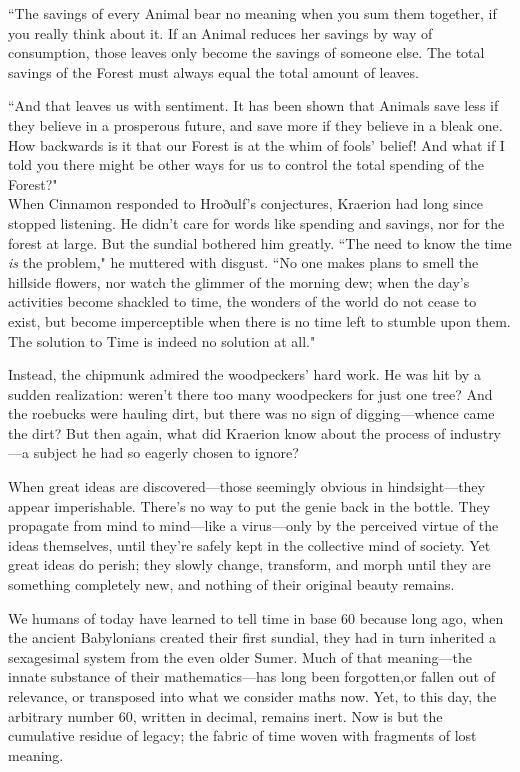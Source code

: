 ``The savings of every Animal bear no meaning when you sum them together, if you really think about it.
If an Animal reduces her savings by way of consumption, those leaves only become the savings of someone else.
The total savings of the Forest must always equal the total amount of leaves.

``And that leaves us with sentiment.
It has been shown that Animals save less if they believe in a prosperous future, and save more if they believe in a bleak one.
How backwards is it that our Forest is at the whim of fools' belief!
And what if I told you there might be other ways for us to control the total spending of the Forest?"\\

When Cinnamon responded to Hroðulf's conjectures, Kraerion had long since stopped listening.
He didn't care for words like spending and savings, nor for the forest at large.
But the sundial bothered him greatly.
``The need to know the time \textit{is} the problem," he muttered with disgust.
``No one makes plans to smell the hillside flowers, nor watch the glimmer of the morning dew; when the day's activities become shackled to time, the wonders of the world do not cease to exist, but become imperceptible when there is no time left to stumble upon them.
The solution to Time is indeed no solution at all."

Instead, the chipmunk admired the woodpeckers' hard work.
He was hit by a sudden realization: weren't there too many woodpeckers for just one tree?
And the roebucks were hauling dirt, but there was no sign of digging---whence came the dirt?
But then again, what did Kraerion know about the process of industry---a subject he had so eagerly chosen to ignore?\\

\renewcommand*{\thepage}{\footnotesize \mayadigit{42}}

When great ideas are discovered---those seemingly obvious in hindsight---they appear imperishable.
There's no way to put the genie back in the bottle.
They propagate from mind to mind---like a virus---only by the perceived virtue of the ideas themselves, until they're safely kept in the collective mind of society.
Yet great ideas do perish; they slowly change, transform, and morph until they are something completely new, and nothing of their original beauty remains.

We humans of today have learned to tell time in base 60 because long ago, when the ancient Babylonians created their first sundial, they had in turn inherited a sexagesimal system from the even older Sumer.
Much of that meaning---the innate substance of their mathematics---has long been forgotten,or fallen out of relevance, or transposed into what we consider maths now.
Yet, to this day, the arbitrary number 60, written in decimal, remains inert.
Now is but the cumulative residue of legacy; the fabric of time woven with fragments of lost meaning.

